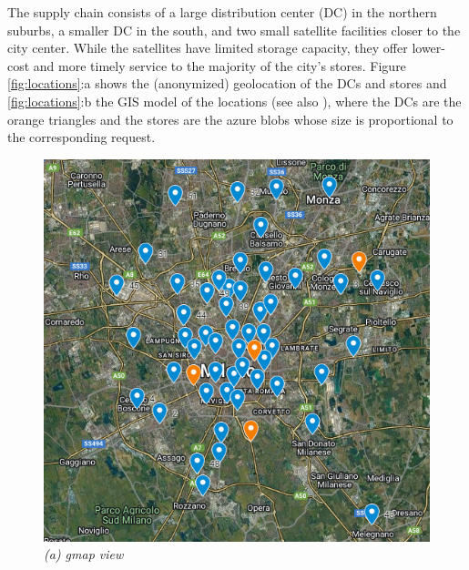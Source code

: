 \documentclass[opre,sglanonrev,11pt]{informs4}
\begin{document}
The supply chain consists of a large distribution center (DC) in the northern suburbs, a smaller DC in the south, and two small satellite facilities closer to the city center. While the satellites have limited storage capacity, they offer lower-cost and more timely service to the majority of the city's stores. Figure \ref{fig:locations}:a shows the (anonymized) geolocation of the DCs and stores and \ref{fig:locations}:b the GIS model of the locations (see also \citealp{MZ23}), where the DCs are the orange triangles and the stores are the azure blobs whose size is proportional to the corresponding request.

\begin{figure}[ht]
	\centering
	\begin{minipage}{0.48\textwidth}
		\centering
		\includegraphics[width=\linewidth]{gmap.png}
		\vspace{0.5em}
		\textit{(a) gmap view}
	\end{minipage}
	\hfill
	\begin{minipage}{0.48\textwidth}
		\centering

\end{minipage}
\end{figure}
\end{document}
